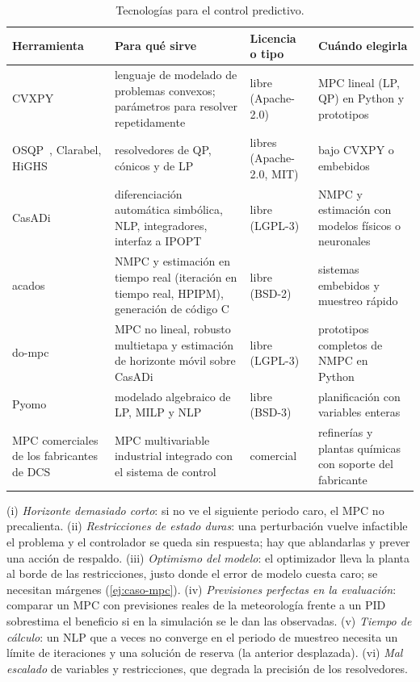 \begin{table}[htbp]
\centering\footnotesize
\begin{tabularx}{\textwidth}{@{}>{\raggedright\arraybackslash}p{3.1cm}>{\raggedright\arraybackslash}X>{\raggedright\arraybackslash}p{2.0cm}>{\raggedright\arraybackslash}X@{}}
\toprule
Herramienta & Para qué sirve & Licencia o tipo & Cuándo elegirla \\
\midrule
CVXPY~\cite{cvxpy} & lenguaje de modelado de problemas convexos; parámetros para resolver repetidamente & libre (Apache-2.0) & MPC lineal (LP, QP) en Python y prototipos \\
OSQP~\cite{osqp}, Clarabel, HiGHS & resolvedores de QP, cónicos y de LP & libres (Apache-2.0, MIT) & bajo CVXPY o embebidos \\
CasADi~\cite{casadi} & diferenciación automática simbólica, NLP, integradores, interfaz a IPOPT & libre (LGPL-3) & NMPC y estimación con modelos físicos o neuronales \\
acados~\cite{acados} & NMPC y estimación en tiempo real (iteración en tiempo real, HPIPM), generación de código C & libre (BSD-2) & sistemas embebidos y muestreo rápido \\
do-mpc~\cite{dompc} & MPC no lineal, robusto multietapa y estimación de horizonte móvil sobre CasADi & libre (LGPL-3) & prototipos completos de NMPC en Python \\
Pyomo & modelado algebraico de LP, MILP y NLP & libre (BSD-3) & planificación con variables enteras \\
MPC comerciales de los fabricantes de DCS & MPC multivariable industrial integrado con el sistema de control & comercial & refinerías y plantas químicas con soporte del fabricante \\
\bottomrule
\end{tabularx}
\caption{Tecnologías para el control predictivo.}
\label{tab:tec3}
\end{table}

\begin{observacion}\label{obs:errores3}
(i) \emph{Horizonte demasiado corto}: si no ve el siguiente periodo caro, el MPC no precalienta. (ii) \emph{Restricciones de estado duras}: una perturbación vuelve infactible el problema y el controlador se queda sin respuesta; hay que ablandarlas y prever una acción de respaldo. (iii) \emph{Optimismo del modelo}: el optimizador lleva la planta al borde de las restricciones, justo donde el error de modelo cuesta caro; se necesitan márgenes (\cref{ej:caso-mpc}). (iv) \emph{Previsiones perfectas en la evaluación}: comparar un MPC con previsiones reales de la meteorología frente a un PID sobrestima el beneficio si en la simulación se le dan las observadas. (v) \emph{Tiempo de cálculo}: un NLP que a veces no converge en el periodo de muestreo necesita un límite de iteraciones y una solución de reserva (la anterior desplazada). (vi) \emph{Mal escalado} de variables y restricciones, que degrada la precisión de los resolvedores.
\end{observacion}

